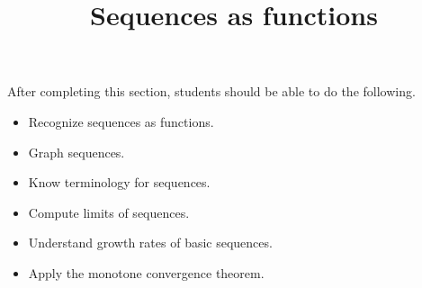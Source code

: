 \documentclass{ximera}
\title{Sequences as functions}
\begin{document}
\begin{abstract}
\end{abstract}

\maketitle

\begin{sectionOutcomes}

After completing this section, students should be able to do the following.

\begin{itemize}
\item Recognize sequences as functions.
\item Graph sequences. 
\item Know terminology for sequences.
\item Compute limits of sequences.
\item Understand growth rates of basic sequences.
\item Apply the monotone convergence theorem.
\end{itemize}

\end{sectionOutcomes}
\end{document}
